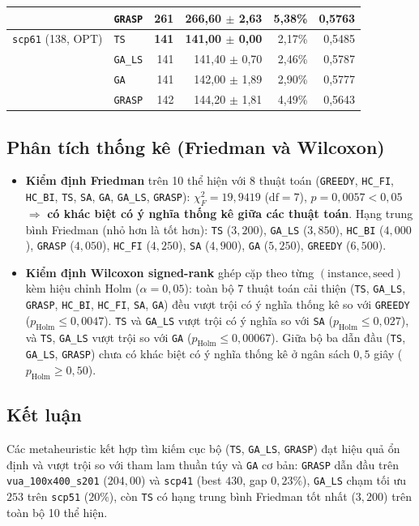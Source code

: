 \begin{center}
\begin{tabular}{llrrrr}
 & \texttt{GRASP} & 261 & 266,60 $\pm$ 2,63 & 5,38\% & 0,5763 \\
\midrule
\texttt{scp61} (138, OPT) & \texttt{TS} & \textbf{141} & \textbf{141,00 $\pm$ 0,00} & 2,17\% & 0,5485 \\
 & \texttt{GA\_LS} & 141 & 141,40 $\pm$ 0,70 & 2,46\% & 0,5787 \\
 & \texttt{GA} & 141 & 142,00 $\pm$ 1,89 & 2,90\% & 0,5777 \\
 & \texttt{GRASP} & 142 & 144,20 $\pm$ 1,81 & 4,49\% & 0,5643 \\
\bottomrule
\end{tabular}
\end{center}

\subsection{Phân tích thống kê (Friedman và Wilcoxon)}
\begin{itemize}
 \item \textbf{Kiểm định Friedman} trên 10 thể hiện với 8 thuật toán (\texttt{GREEDY}, \texttt{HC\_FI}, \texttt{HC\_BI}, \texttt{TS}, \texttt{SA}, \texttt{GA}, \texttt{GA\_LS}, \texttt{GRASP}): $\chi^2_F = 19{,}9419$ ($\mathrm{df}=7$), $p = 0{,}0057 < 0{,}05$ $\Rightarrow$ \textbf{có khác biệt có ý nghĩa thống kê giữa các thuật toán}. Hạng trung bình Friedman (nhỏ hơn là tốt hơn): \texttt{TS} ($3{,}200$), \texttt{GA\_LS} ($3{,}850$), \texttt{HC\_BI} ($4{,}000$), \texttt{GRASP} ($4{,}050$), \texttt{HC\_FI} ($4{,}250$), \texttt{SA} ($4{,}900$), \texttt{GA} ($5{,}250$), \texttt{GREEDY} ($6{,}500$).
 \item \textbf{Kiểm định Wilcoxon signed-rank} ghép cặp theo từng $(\text{instance}, \text{seed})$ kèm hiệu chỉnh Holm ($\alpha = 0{,}05$): toàn bộ 7 thuật toán cải thiện (\texttt{TS}, \texttt{GA\_LS}, \texttt{GRASP}, \texttt{HC\_BI}, \texttt{HC\_FI}, \texttt{SA}, \texttt{GA}) đều vượt trội có ý nghĩa thống kê so với \texttt{GREEDY} ($p_{\mathrm{Holm}} \le 0{,}0047$). \texttt{TS} và \texttt{GA\_LS} vượt trội có ý nghĩa so với \texttt{SA} ($p_{\mathrm{Holm}} \le 0{,}027$), và \texttt{TS}, \texttt{GA\_LS} vượt trội so với \texttt{GA} ($p_{\mathrm{Holm}} \le 0{,}00067$). Giữa bộ ba dẫn đầu (\texttt{TS}, \texttt{GA\_LS}, \texttt{GRASP}) chưa có khác biệt có ý nghĩa thống kê ở ngân sách $0{,}5$ giây ($p_{\mathrm{Holm}} \ge 0{,}50$).
\end{itemize}

\subsection{Kết luận}
Các metaheuristic kết hợp tìm kiếm cục bộ (\texttt{TS}, \texttt{GA\_LS}, \texttt{GRASP}) đạt hiệu quả ổn định và vượt trội so với tham lam thuần túy và \texttt{GA} cơ bản: \texttt{GRASP} dẫn đầu trên \texttt{vua\_100x400\_s201} ($204{,}00$) và \texttt{scp41} (best $430$, gap $0{,}23\%$), \texttt{GA\_LS} chạm tối ưu $253$ trên \texttt{scp51} ($20\%$), còn \texttt{TS} có hạng trung bình Friedman tốt nhất ($3{,}200$) trên toàn bộ 10 thể hiện.
